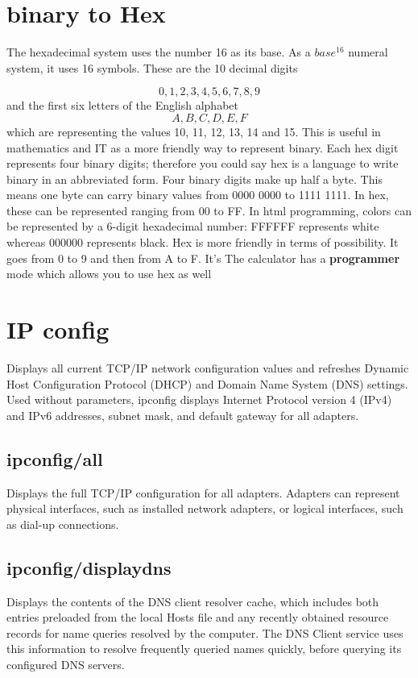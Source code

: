 \documentclass[a4paper,12pt]{book}
\begin{document}
\section{binary to Hex}

The hexadecimal system uses the number 16 as its base. As a $base^{16}$ numeral system, it uses 16 symbols. These are the 10 decimal digits 

\[0, 1, 2, 3, 4, 5, 6, 7, 8, 9\] and the first six letters of the English alphabet \[A, B, C, D, E, F\] which are representing the values 10, 11, 12, 13, 14 and 15.
This is useful in mathematics and IT as a more friendly way to represent binary. Each hex digit represents four binary digits; therefore you could say hex is a language to write binary in an abbreviated form.
Four binary digits make up half a byte. This means one byte can carry binary values from 0000 0000 to 1111 1111. In hex, these can be represented ranging from 00 to FF.
In html programming, colors can be represented by a 6-digit hexadecimal number: FFFFFF represents white whereas 000000 represents black.
Hex is more friendly in terms of possibility. It goes from 0 to 9 and then from A to F. It's 
The calculator has a \textbf{programmer} mode which allows you to use hex as well

\section{IP config}
Displays all current TCP/IP network configuration values and refreshes Dynamic Host Configuration Protocol (DHCP) and Domain Name System (DNS) settings. Used without parameters, ipconfig displays Internet Protocol version 4 (IPv4) and IPv6 addresses, subnet mask, and default gateway for all adapters.

\subsection{ipconfig/all}
Displays the full TCP/IP configuration for all adapters. Adapters can represent physical interfaces, such as installed network adapters, or logical interfaces, such as dial-up connections.

\subsection{ipconfig/displaydns}
Displays the contents of the DNS client resolver cache, which includes both entries preloaded from the local Hosts file and any recently obtained resource records for name queries resolved by the computer. The DNS Client service uses this information to resolve frequently queried names quickly, before querying its configured DNS servers.
\end{document}

